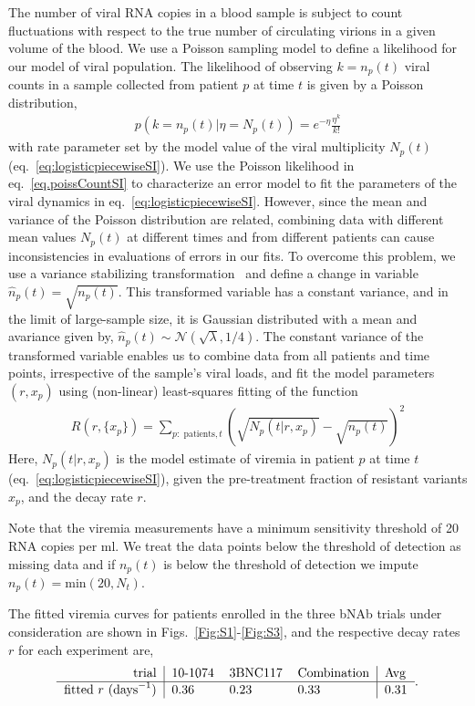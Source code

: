\documentclass[11pt]{article}
\begin{document}
The number of viral RNA copies in a blood sample is subject to count fluctuations with respect to the true number of circulating virions in a given volume of the blood. We use a Poisson sampling model to define a likelihood for our model of viral population. The likelihood of observing $k=n_p(t)$ viral counts in a sample collected from patient $p$ at time $t$ is given by a Poisson distribution,
\begin{align}
p(k = n_p(t)| \eta = N_p(t)) = e^{-\eta} \frac{\eta^k}{k!} 
\label{eq.poissCountSI}
\end{align}
with rate parameter set by the model value of the viral multiplicity $N_p(t)$ (eq.~\ref{eq:logisticpiecewiseSI}). We use the Poisson likelihood in  eq.~\ref{eq.poissCountSI} to characterize an error model to fit the parameters of the viral dynamics in eq.~\ref{eq:logisticpiecewiseSI}. However, since the mean and variance of the Poisson distribution are related, combining data with different mean values $N_p(t)$ at different times and from different patients can cause inconsistencies in evaluations of errors in our fits.  To overcome this problem, we use a variance stabilizing transformation~\cite{mccullaghGeneralizedLinearModels2019} and define a change in variable $\hat n_p(t) = \sqrt{ n_p(t )}$. This transformed variable has a constant variance, and in the limit of large-sample size, it is Gaussian distributed with a mean and avariance given by, $\hat n_p(t)\sim \mathcal{N} ( \sqrt{\lambda},1/4)$. The constant variance of the transformed variable enables us to  combine data from all patients and time points, irrespective of the sample's viral loads, and fit the model parameters $(r,x_p)$ using  (non-linear) least-squares fitting of the function
\begin{align}
R(r, \{x_{p}\}) = \sum_{p:\text{ patients},t} \left( \sqrt{N_p(t|r,x_p)} - \sqrt{n_p(t)} \right)^2
\label{eq:lse}
\end{align}
Here,  $N_p(t|r,x_p)$ is the model estimate of  viremia in patient $p$ at time $t$ (eq.~\ref{eq:logisticpiecewiseSI}), given the  pre-treatment fraction of resistant variants $x_p$, and the decay rate $r$.  


Note that the viremia measurements have a minimum sensitivity threshold of 20 RNA copies per ml. We treat the data points below the threshold of detection as missing data and if $n_p(t)$ is below the threshold of detection we impute $ n_p(t) = \text{min}(20, N_t)$.  

The fitted viremia curves for patients enrolled in the three bNAb trials under consideration are shown in Figs.~\ref{Fig:S1}-\ref{Fig:S3}, and the respective decay rates $r$ for each experiment are,
\begin{align}
\label{tab:decay_rates}
\begin{tabular}{r|lll|l}
trial & 10-1074 & 3BNC117 & Combination & Avg\\
\hline
fitted $r$ ($\text{days}^{-1}$) & 0.36 & 0.23 & 0.33 & 0.31
\end{tabular}.
\end{align}
\end{document}
